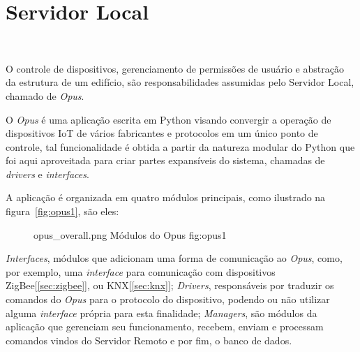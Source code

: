 \section{\textbf{Servidor Local}}
~\label{opus}

O controle de dispositivos, gerenciamento de permissões de usuário e abstração da estrutura de um edifício,
são responsabilidades assumidas pelo Servidor Local, chamado de \emph{Opus}.

O \emph{Opus} é uma aplicação escrita em Python visando convergir a operação de dispositivos IoT de vários
fabricantes e protocolos em um único ponto de controle, tal funcionalidade é obtida a partir da natureza modular
do Python que foi aqui aproveitada para criar partes expansíveis do sistema, chamadas de \emph{drivers} e \emph{interfaces}.

A aplicação é organizada em quatro módulos principais, como ilustrado na figura~\ref{fig:opus1}, são eles:
\begin{figure}[h!]
    {opus_overall.png}
    {Módulos do Opus}
    {fig:opus1}
\end{figure}

\emph{Interfaces}, módulos que adicionam uma forma de comunicação ao \emph{Opus}, como, por exemplo, uma \emph{interface} para comunicação com 
dispositivos ZigBee[\ref{sec:zigbee}], ou KNX[\ref{sec:knx}]; \emph{Drivers}, responsáveis por traduzir os comandos do \emph{Opus} para o 
protocolo do dispositivo, podendo ou não utilizar alguma \emph{interface} própria para esta finalidade; \emph{Managers}, são módulos da aplicação 
que gerenciam seu funcionamento, recebem, enviam e processam comandos vindos do Servidor Remoto e por fim, o banco de dados.



